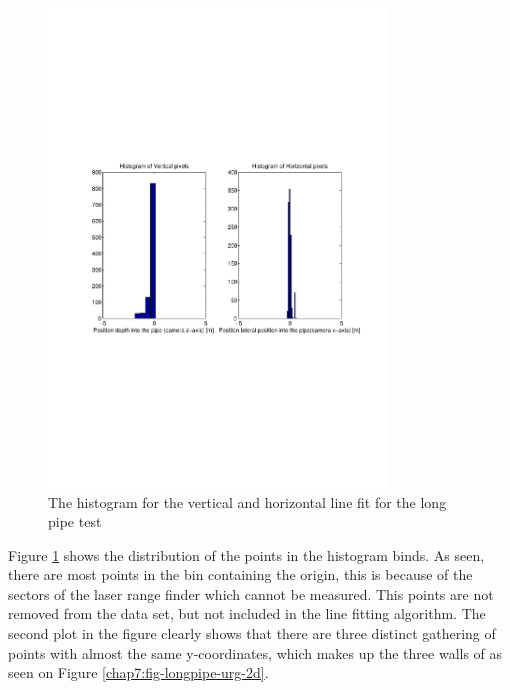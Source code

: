 \begin{figure}[htbp]
    \centering
    \includegraphics[width=0.8\textwidth]{pics/longpipe-urg-hist}
    \caption{The histogram for the vertical and horizontal line fit for the long pipe test}
    \label{chap8:fig-longpipe-urg-hist}
\end{figure}
Figure \ref{chap8:fig-longpipe-urg-hist} shows the distribution of the points in the
histogram binds. As seen, there are most points in the bin containing the origin, this is
because of the sectors of the laser range finder which cannot be measured. This points are
not removed from the data set, but not included in the line fitting algorithm. 
The second plot in the figure clearly shows that there are three distinct gathering of
points with almost the same y-coordinates, which makes up the three walls of as seen on
Figure \ref{chap7:fig-longpipe-urg-2d}.

